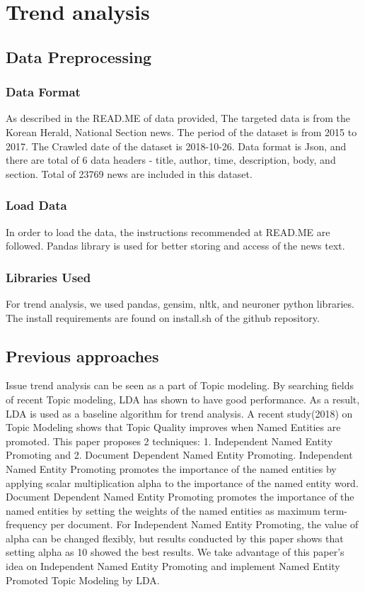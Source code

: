 \section{Trend analysis}

\subsection{Data Preprocessing}
\subsubsection{Data Format}
As described in the READ.ME of data provided, The targeted data is from the Korean Herald, National Section news. The period of the dataset is from 2015 to 2017. The Crawled date of the dataset is 2018-10-26. Data format is Json, and there are total of 6 data headers - title, author, time, description, body, and section. Total of 23769 news are included in this dataset.

\subsubsection{Load Data}
In order to load the data, the instructions recommended at READ.ME are followed. Pandas library is used for better storing and access of the news text.
\subsubsection{Libraries Used}
For trend analysis, we used pandas, gensim, nltk, and neuroner python libraries. The install requirements are found on install.sh of the github repository.


\subsection{Previous approaches}
Issue trend analysis can be seen as a part of Topic modeling. By searching fields of recent Topic modeling, LDA has shown to have good performance. As a result, LDA is used as a baseline algorithm for trend analysis.
A recent study(2018) on Topic Modeling shows that Topic Quality improves when Named Entities are promoted.\cite{krasnashchok-jouili-2018-improving} This paper proposes 2 techniques: 1. Independent Named Entity Promoting and 2. Document Dependent Named Entity Promoting. Independent Named Entity Promoting promotes the importance of the named entities by applying scalar multiplication alpha to the importance of the named entity word. Document Dependent Named Entity Promoting promotes the importance of the named entities by setting the weights of the named entities as maximum term-frequency per document. For Independent Named Entity Promoting, the value of alpha can be changed flexibly, but results conducted by this paper shows that setting alpha as 10 showed the best results.
We take advantage of this paper's idea on Independent Named Entity Promoting and implement Named Entity Promoted Topic Modeling by LDA.
